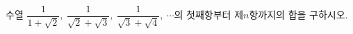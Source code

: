 수열 $\dfrac{1}{1+\sqrt{2}},\ \dfrac{1}{\sqrt{2}+\sqrt{3}},\ \dfrac{1}{\sqrt{3}+\sqrt{4}},\ \cdots$의 첫째항부터 \mbox{제$n$항}까지의 합을 구하시오.
